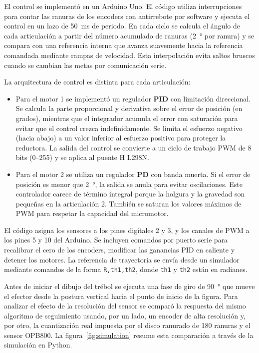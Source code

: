 \documentclass[11pt,a4paper]{article}
\begin{document}
El control se implementó en un Arduino Uno.  El código utiliza interrupciones para contar las ranuras de los encoders con antirrebote por software y ejecuta el control en un lazo de \SI{50}{\milli\second} de periodo.  En cada ciclo se calcula el ángulo de cada articulación a partir del número acumulado de ranuras (\SI{2}{\degree} por ranura) y se compara con una referencia interna que avanza suavemente hacia la referencia comandada mediante rampas de velocidad.  Esta interpolación evita saltos bruscos cuando se cambian las metas por comunicación serie.

La arquitectura de control es distinta para cada articulación:
\begin{itemize}
  \item Para el motor 1 se implementó un regulador \textbf{PID} con limitación direccional.  Se calcula la parte proporcional y derivativa sobre el error de posición (en grados), mientras que el integrador acumula el error con saturación para evitar que el control crezca indefinidamente.  Se limita el esfuerzo negativo (hacia abajo) a un valor inferior al esfuerzo positivo para proteger la reductora.  La salida del control se convierte a un ciclo de trabajo PWM de 8 bits (0–255) y se aplica al puente H L298N.
  \item Para el motor 2 se utiliza un regulador \textbf{PD} con banda muerta.  Si el error de posición es menor que \SI{2}{\degree}, la salida se anula para evitar oscilaciones.  Este controlador carece de término integral porque la holgura y la gravedad son pequeñas en la articulación 2.  También se saturan los valores máximos de PWM para respetar la capacidad del micromotor.
\end{itemize}

El código asigna los sensores a los pines digitales 2 y 3, y los canales de PWM a los pines 5 y 10 del Arduino.  Se incluyen comandos por puerto serie para recalibrar el cero de los encoders, modificar las ganancias PID en caliente y detener los motores.  La referencia de trayectoria se envía desde un simulador mediante comandos de la forma \texttt{R,th1,th2}, donde \texttt{th1} y \texttt{th2} están en radianes.

Antes de iniciar el dibujo del trébol se ejecuta una fase de giro de \SI{90}{\degree} que mueve el efector desde la postura vertical hacia el punto de inicio de la figura. Para analizar el efecto de la resolución del sensor se comparó la respuesta del mismo algoritmo de seguimiento usando, por un lado, un encoder de alta resolución y, por otro, la cuantización real impuesta por el disco ranurado de \SI{180}{} ranuras y el sensor OPB800. La figura~\ref{fig:simulation} resume esta comparación a través de la simulación en Python.
\end{document}
